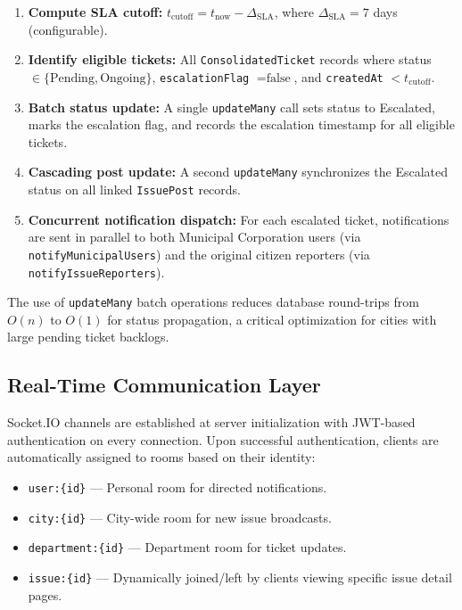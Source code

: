 \documentclass[conference]{IEEEtran}
\begin{document}
\begin{enumerate}
\item \textbf{Compute SLA cutoff:} $t_{\text{cutoff}} = t_{\text{now}} - \Delta_{\text{SLA}}$, where $\Delta_{\text{SLA}} = 7$ days (configurable).
\item \textbf{Identify eligible tickets:} All \texttt{ConsolidatedTicket} records where status $\in \{\text{Pending}, \text{Ongoing}\}$, \texttt{escalationFlag} $= \text{false}$, and \texttt{createdAt} $< t_{\text{cutoff}}$.
\item \textbf{Batch status update:} A single \texttt{updateMany} call sets status to Escalated, marks the escalation flag, and records the escalation timestamp for all eligible tickets.
\item \textbf{Cascading post update:} A second \texttt{updateMany} synchronizes the Escalated status on all linked \texttt{IssuePost} records.
\item \textbf{Concurrent notification dispatch:} For each escalated ticket, notifications are sent in parallel to both Municipal Corporation users (via \texttt{notifyMunicipalUsers}) and the original citizen reporters (via \texttt{notifyIssueReporters}).
\end{enumerate}

The use of \texttt{updateMany} batch operations reduces database round-trips from $O(n)$ to $O(1)$ for status propagation, a critical optimization for cities with large pending ticket backlogs.

\subsection{Real-Time Communication Layer}

Socket.IO channels are established at server initialization with JWT-based authentication on every connection. Upon successful authentication, clients are automatically assigned to rooms based on their identity:

\begin{itemize}
\item \texttt{user:\{id\}} --- Personal room for directed notifications.
\item \texttt{city:\{id\}} --- City-wide room for new issue broadcasts.
\item \texttt{department:\{id\}} --- Department room for ticket updates.
\item \texttt{issue:\{id\}} --- Dynamically joined/left by clients viewing specific issue detail pages.
\end{itemize}
\end{document}
